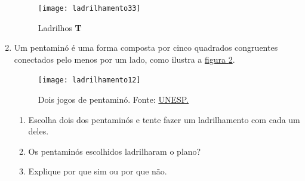 \begin{enumerate}
	\begin{figure}[H]
	\centering
	\texttt{[image: ladrilhamento33]}
	\caption{Ladrilhos \textbf{T}}
	\label{ladt}
	\end{figure}

\item  Um pentaminó é uma forma composta por cinco quadrados congruentes conectados pelo menos por um lado, como ilustra a \hyperref[pentamino]{figura \ref{pentamino}}.

	\begin{figure}[H]
	\centering
	\texttt{[image: ladrilhamento12]}
	\caption{Dois jogos de pentaminó. Fonte: \href{https://www.ibilce.unesp.br/departamentos/matematica/eventos/3-cejta/regra-dos-jogos/9-ano---pentamino/}{UNESP.}}
	\label{pentamino}
	\end{figure}
	
	\begin{enumerate}
		\item Escolha dois dos pentaminós e tente fazer um ladrilhamento com cada um deles.
		\item Os pentaminós escolhidos ladrilharam o plano?
		\item Explique por que sim ou por que não.
	\end{enumerate}


	
	
\end{enumerate}




\ifnum{}
\clearpage
\else
\notasfinais
\fi




\nocite{*}
